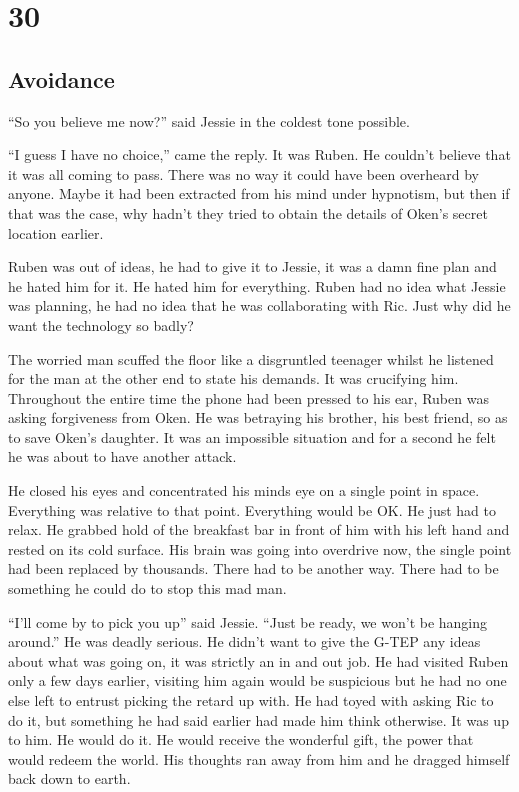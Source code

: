 \chapter{30}
\section{Avoidance}


``So you believe me now?'' said Jessie in the coldest tone possible.

``I guess I have no choice,'' came the reply.  It was Ruben.  He couldn't believe that it was all coming to pass.  There was no way it could have been overheard by anyone.  Maybe it had been extracted from his mind under hypnotism, but then if that was the case, why hadn't they tried to obtain the details of Oken's secret location earlier.  

Ruben was out of ideas, he had to give it to Jessie, it was a damn fine plan and he hated him for it.  He hated him for everything.  Ruben had no idea what Jessie was planning, he had no idea that he was collaborating with Ric.  Just why did he want the technology so badly?

The worried man scuffed the floor like a disgruntled teenager whilst he listened for the man at the other end to state his demands.  It was crucifying him.  Throughout the entire time the phone had been pressed to his ear, Ruben was asking forgiveness from Oken.  He was betraying his brother, his best friend, so as to save Oken's daughter.   It was an impossible situation and for a second he felt he was about to have another attack.  

He closed his eyes and concentrated his minds eye on a single point in space.  Everything was relative to that point.  Everything would be OK.  He just had to relax.  He grabbed hold of the breakfast bar in front of him with his left hand and rested on its cold surface.  His brain was going into overdrive now, the single point had been replaced by thousands.  There had to be another way.  There had to be something he could do to stop this mad man.

``I'll come by to pick you up'' said Jessie.  ``Just be ready, we won't be hanging around.''  He was deadly serious.  He didn't want to give the G-TEP any ideas about what was going on, it was strictly an in and out job.  He had visited Ruben only a few days earlier, visiting him again would be suspicious but he had no one else left to entrust picking the retard up with.  He had toyed with asking Ric to do it, but something he had said earlier had made him think otherwise.  It was up to him.  He would do it.  He would receive the wonderful gift, the power that would redeem the world.  His thoughts ran away from him and he dragged himself back down to earth.

